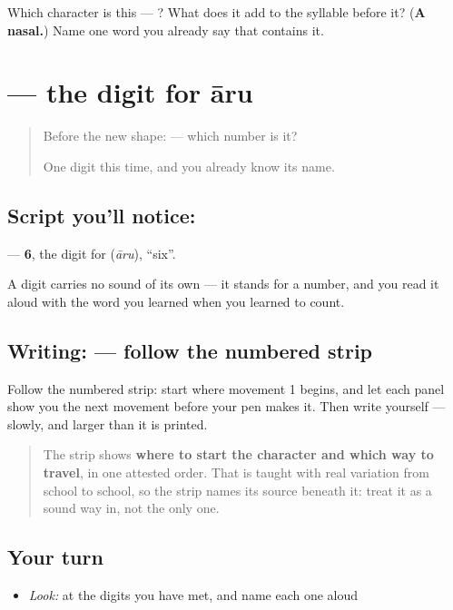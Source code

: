 \begin{tcolorbox}[breakable,colback=teal!4,colframe=teal!35!black,title={Before you move on}]
Which character is this — ? What does it add to the syllable before it? (\textbf{A nasal.}) Name one word you already say that contains it.
\end{tcolorbox}
\section[\texorpdfstring{\kn{೬} (6)}{೬ (6)}]{ — the digit for āru}

\label{lesson:KA-S145-digit-six}



\begin{quote}
Before the new shape: \textbf{} — which number is it?

One digit this time, and you already know its name.
\end{quote}

\subsection*{Script you'll notice: }
\textbf{} — \textbf{6}, the digit for \textbf{} (\emph{āru}), \textquotedblleft{}six\textquotedblright{}.

A digit carries no sound of its own — it stands for a number, and you read it aloud with the word you learned when you learned to count.

\subsection*{Writing:  — follow the numbered strip}

Follow the numbered strip: start where movement 1 begins, and let each panel show you the next movement before your pen makes it. Then write  yourself — slowly, and larger than it is printed.

\begin{quote}
The strip shows \textbf{where to start the character and which way to travel}, in one attested order. That is taught with real variation from school to school, so the strip names its source beneath it: treat it as a sound way in, not the only one.
\end{quote}

\subsection*{Your turn}
\begin{itemize}
\raggedright
  \item \emph{Look:} at the digits you have met, and name each one aloud
\end{itemize}


